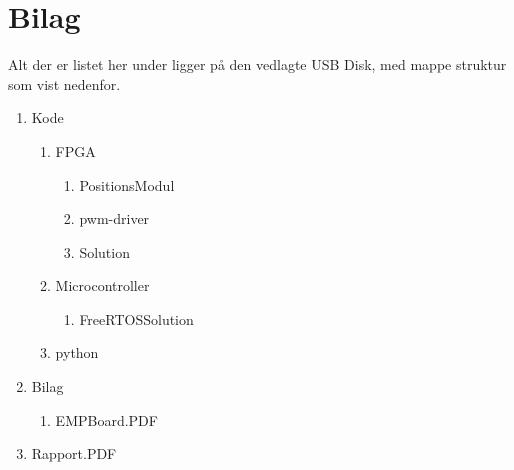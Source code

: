 \appendix
\section{Bilag} \hfill
Alt der er listet her under ligger på den vedlagte USB Disk, med mappe struktur som vist nedenfor.
\label{sec:bilag}
\begin{enumerate}[noitemsep]
	\item Kode
	\begin{enumerate}[noitemsep]
		\item FPGA
			\begin{enumerate}
				\item PositionsModul
				\item pwm-driver
				\item Solution
			\end{enumerate}
		\item Microcontroller
		\begin{enumerate}
			\item FreeRTOS\textunderscore Solution
		\end{enumerate}
		\item python
	\end{enumerate}
	\item Bilag
	\begin{enumerate}[noitemsep]
		\item EMPBoard.PDF \label{itm:empboard}
	\end{enumerate}
	\item Rapport.PDF
\end{enumerate}
